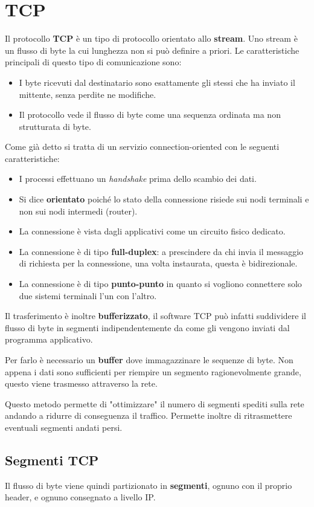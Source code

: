 \section{TCP}
Il protocollo \textbf{TCP} è un tipo di protocollo orientato allo 
\textbf{stream}. Uno stream è un flusso di byte la cui lunghezza non si
può definire a priori. Le caratteristiche principali di questo tipo di 
comunicazione sono:
\begin{itemize}
	\item I byte ricevuti dal destinatario sono esattamente gli stessi
		che ha inviato il mittente, senza perdite ne modifiche.
	\item Il protocollo vede il flusso di byte come una sequenza 
		ordinata ma non strutturata di byte.
\end{itemize}
Come già detto si tratta di un servizio connection-oriented con le 
seguenti caratteristiche:
\begin{itemize}
	\item I processi effettuano un \emph{handshake} prima dello 
		scambio dei dati.
	\item Si dice \textbf{orientato} poiché lo stato della connessione 
		risiede sui nodi terminali e non sui nodi intermedi (router).
	\item La connessione è vista dagli applicativi come un circuito 
		fisico dedicato.
	\item La connessione è di tipo \textbf{full-duplex}: a prescindere 
		da chi invia il messaggio di richiesta per la connessione, una 
		volta instaurata, questa è bidirezionale.
	\item La connessione è di tipo \textbf{punto-punto} in quanto si 
		vogliono connettere solo due sistemi terminali l'un con 
		l'altro.
\end{itemize}
Il trasferimento è inoltre \textbf{bufferizzato}, il software TCP può 
infatti suddividere il flusso di byte in segmenti indipendentemente da 
come gli vengono inviati dal programma applicativo.

Per farlo è necessario un \textbf{buffer} dove immagazzinare le 
sequenze di byte. Non appena i dati sono sufficienti per riempire un 
segmento ragionevolmente grande, questo viene trasmesso attraverso la
rete.

Questo metodo permette di "ottimizzare" il numero di segmenti spediti 
sulla rete andando a ridurre di conseguenza il traffico. Permette 
inoltre di ritrasmettere eventuali segmenti andati persi.

\subsection{Segmenti TCP}
Il flusso di byte viene quindi partizionato in \textbf{segmenti}, 
ognuno con il proprio header, e ognuno consegnato a livello IP.

